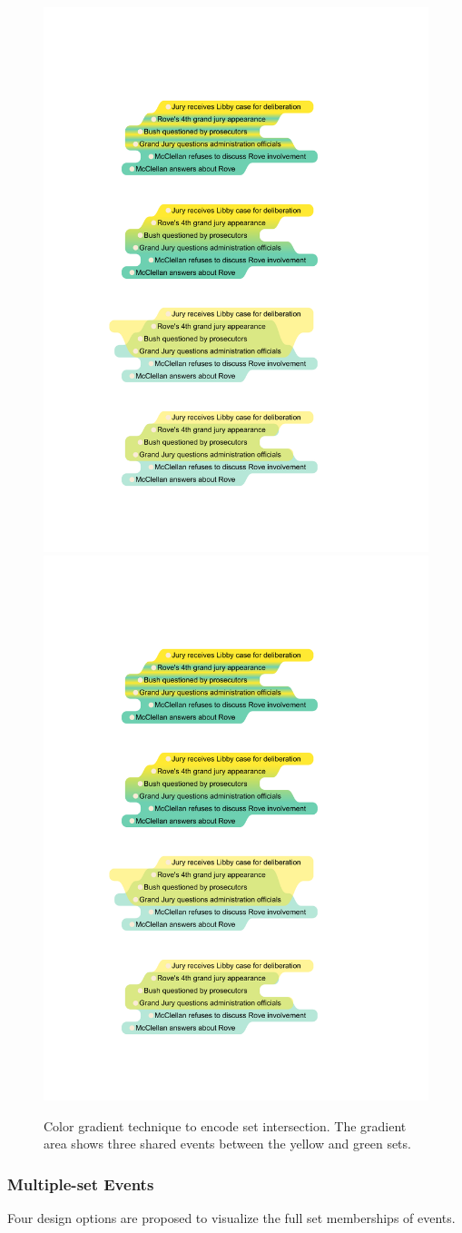 \begin{figure}[!htb]
	\centering
	{\includegraphics[width=0.47\columnwidth]{figure7a}}
	\hfill
	{\includegraphics[width=0.47\columnwidth]{figure7b}}
	\caption{Color gradient technique to encode set intersection. The gradient area shows three shared events between the yellow and green sets.}
	\label{fig:gradient}
\end{figure}

\subsubsection{Multiple-set Events}
Four design options are proposed to visualize the full set memberships of events.


